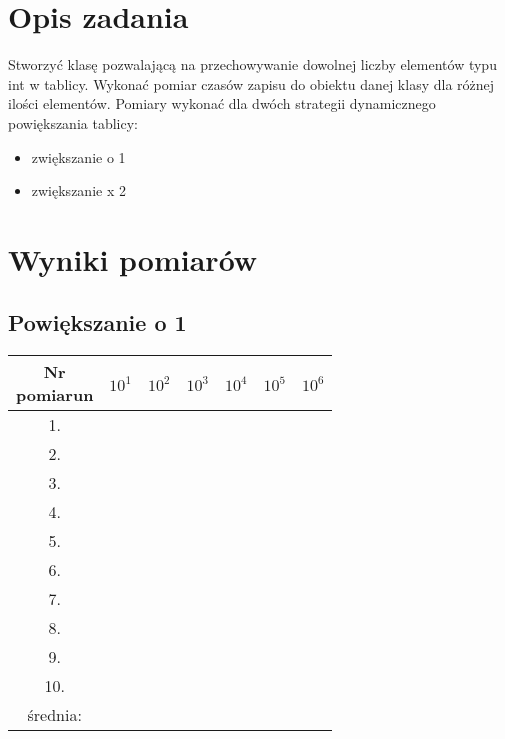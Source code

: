 \documentclass[12pt,a4paper]{article}
\begin{document}
\maketitle
\tableofcontents
\newpage


\section{Opis zadania}
Stworzyć klasę pozwalającą na przechowywanie dowolnej liczby elementów typu int w tablicy. Wykonać pomiar czasów zapisu do obiektu danej klasy dla różnej ilości elementów. Pomiary wykonać dla dwóch strategii dynamicznego powiększania tablicy:
\begin{itemize}
\item zwiększanie o 1
\item zwiększanie x 2
\end{itemize}

\section{Wyniki pomiarów}
\subsection{Powiększanie o 1}
\begin{tabular}{|c|c|c|c|c|c|c|} \hline
\diagbox[width=6em]{Nr \\pomiaru}{n} & $10^1$ & $10^2$ & $10^3$ & $10^4$ & $10^5$ & $10^6$\\ \hline
1. &&&&&& \\ \hline
2. &&&&&& \\ \hline
3. &&&&&& \\ \hline
4. &&&&&& \\ \hline
5. &&&&&& \\ \hline
6. &&&&&& \\ \hline
7. &&&&&& \\ \hline
8. &&&&&& \\ \hline
9. &&&&&& \\ \hline
10. &&&&&& \\ \hline
średnia: &&&&&& \\ \hline
\end{tabular}
\end{document}
